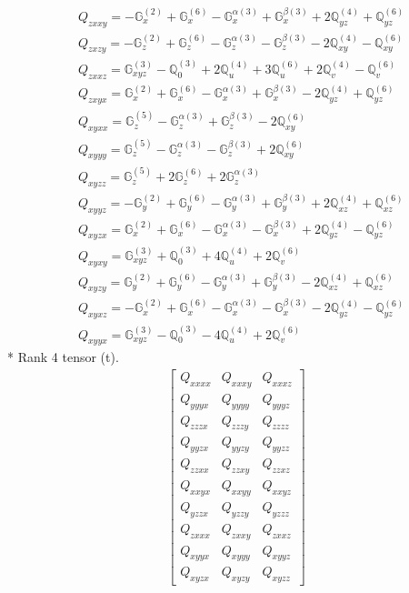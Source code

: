 \documentclass[fleqn,8pt,landscape]{jsarticle}
\begin{document}
\begin{align*}
& Q_{zxxy} = - \mathbb{G}_{x}^{(2)} + \mathbb{G}_{x}^{(6)} - \mathbb{G}_{x}^{\alpha(3)} + \mathbb{G}_{x}^{\beta(3)} + 2 \mathbb{Q}_{yz}^{(4)} + \mathbb{Q}_{yz}^{(6)} \\
& Q_{zxzy} = - \mathbb{G}_{z}^{(2)} + \mathbb{G}_{z}^{(6)} - \mathbb{G}_{z}^{\alpha(3)} - \mathbb{G}_{z}^{\beta(3)} - 2 \mathbb{Q}_{xy}^{(4)} - \mathbb{Q}_{xy}^{(6)} \\
& Q_{zxxz} = \mathbb{G}_{xyz}^{(3)} - \mathbb{Q}_{0}^{(3)} + 2 \mathbb{Q}_{u}^{(4)} + 3 \mathbb{Q}_{u}^{(6)} + 2 \mathbb{Q}_{v}^{(4)} - \mathbb{Q}_{v}^{(6)} \\
& Q_{zxyx} = \mathbb{G}_{x}^{(2)} + \mathbb{G}_{x}^{(6)} - \mathbb{G}_{x}^{\alpha(3)} + \mathbb{G}_{x}^{\beta(3)} - 2 \mathbb{Q}_{yz}^{(4)} + \mathbb{Q}_{yz}^{(6)} \\
& Q_{xyxx} = \mathbb{G}_{z}^{(5)} - \mathbb{G}_{z}^{\alpha(3)} + \mathbb{G}_{z}^{\beta(3)} - 2 \mathbb{Q}_{xy}^{(6)} \\
& Q_{xyyy} = \mathbb{G}_{z}^{(5)} - \mathbb{G}_{z}^{\alpha(3)} - \mathbb{G}_{z}^{\beta(3)} + 2 \mathbb{Q}_{xy}^{(6)} \\
& Q_{xyzz} = \mathbb{G}_{z}^{(5)} + 2 \mathbb{G}_{z}^{(6)} + 2 \mathbb{G}_{z}^{\alpha(3)} \\
& Q_{xyyz} = - \mathbb{G}_{y}^{(2)} + \mathbb{G}_{y}^{(6)} - \mathbb{G}_{y}^{\alpha(3)} + \mathbb{G}_{y}^{\beta(3)} + 2 \mathbb{Q}_{xz}^{(4)} + \mathbb{Q}_{xz}^{(6)} \\
& Q_{xyzx} = \mathbb{G}_{x}^{(2)} + \mathbb{G}_{x}^{(6)} - \mathbb{G}_{x}^{\alpha(3)} - \mathbb{G}_{x}^{\beta(3)} + 2 \mathbb{Q}_{yz}^{(4)} - \mathbb{Q}_{yz}^{(6)} \\
& Q_{xyxy} = \mathbb{G}_{xyz}^{(3)} + \mathbb{Q}_{0}^{(3)} + 4 \mathbb{Q}_{u}^{(4)} + 2 \mathbb{Q}_{v}^{(6)} \\
& Q_{xyzy} = \mathbb{G}_{y}^{(2)} + \mathbb{G}_{y}^{(6)} - \mathbb{G}_{y}^{\alpha(3)} + \mathbb{G}_{y}^{\beta(3)} - 2 \mathbb{Q}_{xz}^{(4)} + \mathbb{Q}_{xz}^{(6)} \\
& Q_{xyxz} = - \mathbb{G}_{x}^{(2)} + \mathbb{G}_{x}^{(6)} - \mathbb{G}_{x}^{\alpha(3)} - \mathbb{G}_{x}^{\beta(3)} - 2 \mathbb{Q}_{yz}^{(4)} - \mathbb{Q}_{yz}^{(6)} \\
& Q_{xyyx} = \mathbb{G}_{xyz}^{(3)} - \mathbb{Q}_{0}^{(3)} - 4 \mathbb{Q}_{u}^{(4)} + 2 \mathbb{Q}_{v}^{(6)}
\end{align*}
* Rank 4 tensor (t).
\begin{align*}
\begin{bmatrix} Q_{xxxx} & Q_{xxxy} & Q_{xxxz} \\ Q_{yyyx} & Q_{yyyy} & Q_{yyyz} \\ Q_{zzzx} & Q_{zzzy} & Q_{zzzz} \\ Q_{yyzx} & Q_{yyzy} & Q_{yyzz} \\ Q_{zzxx} & Q_{zzxy} & Q_{zzxz} \\ Q_{xxyx} & Q_{xxyy} & Q_{xxyz} \\ Q_{yzzx} & Q_{yzzy} & Q_{yzzz} \\ Q_{zxxx} & Q_{zxxy} & Q_{zxxz} \\ Q_{xyyx} & Q_{xyyy} & Q_{xyyz} \\ Q_{xyzx} & Q_{xyzy} & Q_{xyzz} \end{bmatrix}
\end{align*}
\end{document}
